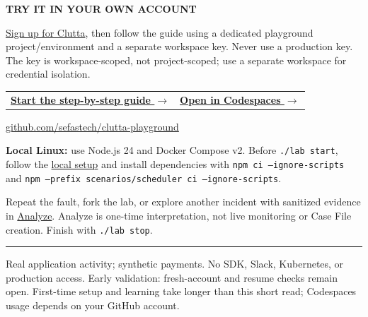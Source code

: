 \documentclass[10pt,a4paper]{article}
\newcommand{\sectionlabel}[1]{{\sffamily\fontsize{8.5}{10}\selectfont\bfseries\color{blue}\MakeUppercase{#1}}}
\newcommand{\bodytext}[1]{{\fontsize{10.2}{14}\selectfont #1\par}}
\begin{document}
\sectionlabel{Try it in your own account}\par\vspace{2mm}
\bodytext{\href{https://app.clutta.io/signup}{Sign up for Clutta}, then follow the guide using a dedicated playground project/environment and a separate workspace key. Never use a production key. The key is workspace-scoped, not project-scoped; use a separate workspace for credential isolation.}
\vspace{2.5mm}
\begin{tabularx}{\linewidth}{@{}X X@{}}
  \href{https://github.com/sefastech/clutta-playground/blob/main/docs/onboarding.md}{\textbf{Start the step-by-step guide $\rightarrow$}} &
  \raggedleft\href{https://codespaces.new/sefastech/clutta-playground}{\textbf{Open in Codespaces $\rightarrow$}}\tabularnewline
\end{tabularx}
\vspace{2mm}
{\fontsize{9}{12}\selectfont\href{https://github.com/sefastech/clutta-playground}{github.com/sefastech/clutta-playground}\par}
\vspace{1mm}
{\fontsize{9}{12}\selectfont\textbf{Local Linux:} use Node.js 24 and Docker Compose v2. Before \texttt{./lab start}, follow the \href{https://github.com/sefastech/clutta-playground/blob/main/docs/onboarding.md\#local-linux}{local setup} and install dependencies with \texttt{npm ci --ignore-scripts} and \texttt{npm --prefix scenarios/scheduler ci --ignore-scripts}.\par}
\vspace{3mm}
{\fontsize{9}{12}\selectfont Repeat the fault, fork the lab, or explore another incident with sanitized evidence in \href{https://app.clutta.io/analyze}{Analyze}. Analyze is one-time interpretation, not live monitoring or Case File creation. Finish with \texttt{./lab stop}.\par}

\vfill
{\color{blue}\rule{\linewidth}{0.5pt}}\par\vspace{1.5mm}
{\fontsize{8}{10.5}\selectfont\color{black}Real application activity; synthetic payments. No SDK, Slack, Kubernetes, or production access. Early validation: fresh-account and resume checks remain open. First-time setup and learning take longer than this short read; Codespaces usage depends on your GitHub account.\par}
\end{document}
